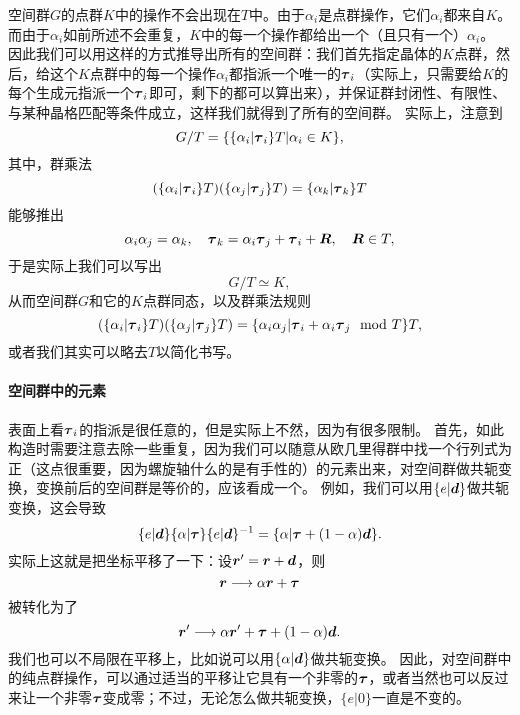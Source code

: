 空间群$G$的点群$K$中的操作不会出现在$T$中。由于$\alpha_i$是点群操作，它们$\alpha_i$都来自$K$。而由于$\alpha_i$如前所述不会重复，$K$中的每一个操作都给出一个（且只有一个）$\alpha_i$。
因此我们可以用这样的方式推导出所有的空间群：我们首先指定晶体的$K$点群，然后，给这个$K$点群中的每一个操作$\alpha_i$都指派一个唯一的$\vb*{\tau}_i$（实际上，只需要给$K$的每个生成元指派一个$\vb*{\tau}_i$即可，剩下的都可以算出来），并保证群封闭性、有限性、与某种晶格匹配等条件成立，这样我们就得到了所有的空间群。
实际上，注意到
\[
    G / T = \{ \{\alpha_i | \vb*{\tau}_i \} T | \alpha_i \in K \},
\]
其中，群乘法
\[
    (\{\alpha_i | \vb*{\tau}_i \} T) (\{\alpha_j | \vb*{\tau}_j \} T) = \{\alpha_k | \vb*{\tau}_k \} T
\]
能够推出
\[
    \alpha_i \alpha_j = \alpha_k, \quad \vb*{\tau}_k = \alpha_i \vb*{\tau}_j + \vb*{\tau}_i + \vb*{R}, \quad \vb*{R} \in T,
\] 
于是实际上我们可以写出
\begin{equation}
    G / T \simeq K,
\end{equation}
从而空间群$G$和它的$K$点群同态，以及群乘法规则
\begin{equation}
    (\{\alpha_i | \vb*{\tau}_i \} T) (\{\alpha_j | \vb*{\tau}_j \} T) = \{\alpha_i \alpha_j | \vb*{\tau}_i + \alpha_i \vb*{\tau}_j \mod{T} \} T,
\end{equation}
或者我们其实可以略去$T$以简化书写。

\paragraph{空间群中的元素} 表面上看$\vb*{\tau}_i$的指派是很任意的，但是实际上不然，因为有很多限制。
首先，如此构造时需要注意去除一些重复，因为我们可以随意从欧几里得群中找一个行列式为正（这点很重要，因为螺旋轴什么的是有手性的）的元素出来，对空间群做共轭变换，变换前后的空间群是等价的，应该看成一个。
例如，我们可以用$\{e | \vb*{d}\}$做共轭变换，这会导致
\[
    \{e | \vb*{d}\} \{ \alpha | \vb*{\tau} \} \{ e | \vb*{d} \}^{-1} = \{ \alpha | \vb*{\tau} + (1 - \alpha) \vb*{d} \}.
\]
实际上这就是把坐标平移了一下：设$\vb*{r}' = \vb*{r} + \vb*{d}$，则
\[
    \vb*{r} \longrightarrow \alpha \vb*{r} + \vb*{\tau}
\]
被转化为了
\begin{equation}
    \vb*{r}' \longrightarrow \alpha \vb*{r}' + \vb*{\tau} + (1 - \alpha) \vb*{d}.
    \label{eq:conju-alpha}
\end{equation}
我们也可以不局限在平移上，比如说可以用$\{\alpha | \vb*{d}\}$做共轭变换。
因此，对空间群中的纯点群操作，可以通过适当的平移让它具有一个非零的$\vb*{\tau}$，或者当然也可以反过来让一个非零$\vb*{\tau}$变成零；不过，无论怎么做共轭变换，$\{e | 0\}$一直是不变的。

